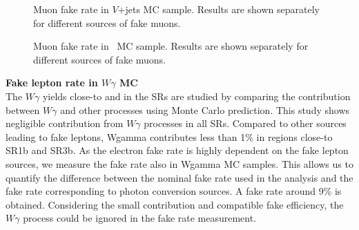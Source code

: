 \begin{figure}[p!]
\centering
{}
\caption
{Muon fake rate in $V$+jets MC sample. Results are shown separately for different sources of fake muons.} 
\label{Fig:Vjets_FR_MU}  
\end{figure}
\begin{figure}[p!]
\centering
{}
\caption
{Muon fake rate in \ttbar\ MC sample. Results are shown separately for different sources of fake muons.} 
\label{Fig:TTBAR_FR_MU}  
\end{figure}

\par{\bf Fake lepton rate in $W\gamma$ MC\\}
The $W\gamma$ yields close-to and in the SRs are studied by comparing the contribution between $W\gamma$ and other processes using Monte Carlo prediction.
This study shows negligible contribution from $W\gamma$ processes in all SRs.
Compared to other sources leading to fake leptons, Wgamma contributes less than 1\% in regions close-to SR1b and SR3b.
As the electron fake rate is highly dependent on the fake lepton sources, we measure the fake rate also in Wgamma MC samples. 
This allows us to quantify the difference between the nominal fake rate used in the analysis and the fake rate corresponding to photon conversion sources. 
A fake rate around 9\% is obtained. Considering the small contribution and compatible fake efficiency, the $W\gamma$ process could be ignored in the fake rate measurement.

